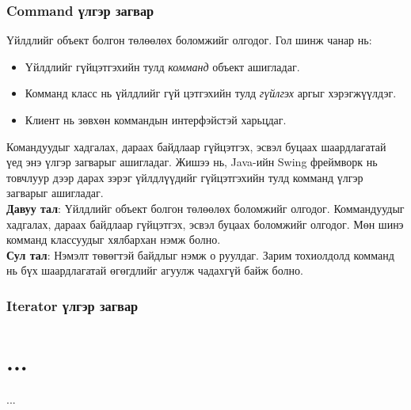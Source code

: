 \subsubsection	{Command үлгэр загвар}
\quad \quad Үйлдлийг объект болгон төлөөлөх боломжийг олгодог. Гол шинж чанар нь:
\begin{itemize}
	\item Үйлдлийг гүйцэтгэхийн тулд \textit{комманд} объект ашигладаг.
	\item Комманд класс нь үйлдлийг гүй		цэтгэхийн тулд \textit{гүйлгэх} аргыг хэрэгжүүлдэг.
	\item Клиент нь зөвхөн коммандын интерфэйстэй харьцдаг.
\end{itemize}
Командуудыг хадгалах, дараах байдлаар гүйцэтгэх, эсвэл буцаах шаардлагатай үед энэ үлгэр загварыг ашигладаг. Жишээ нь, Java-ийн Swing фреймворк нь товчлуур дээр дарах зэрэг үйлдлүүдийг гүйцэтгэхийн тулд комманд үлгэр загварыг ашигладаг.\\
\textbf{Давуу тал}: Үйлдлийг объект болгон төлөөлөх боломжийг олгодог. Коммандуудыг хадгалах, дараах байдлаар гүйцэтгэх, эсвэл буцаах боломжийг олгодог. Мөн шинэ комманд классуудыг хялбархан нэмж болно.\\
\textbf{Сул тал}: Нэмэлт төвөгтэй байдлыг нэмж о	руулдаг. Зарим тохиолдолд комманд нь бүх шаардлагатай өгөгдлийг агуулж чадахгүй байж болно.	

\subsubsection{Iterator үлгэр загвар}
\section{...}
...
